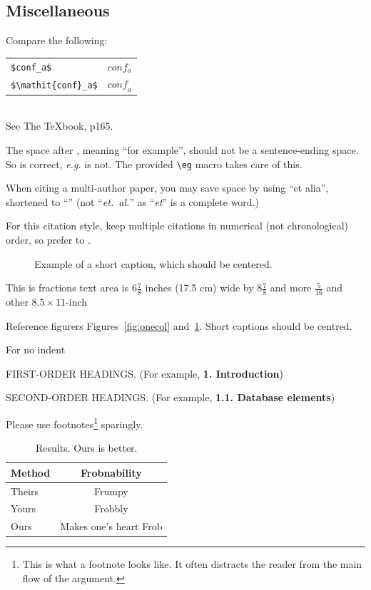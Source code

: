 \documentclass[10pt,twocolumn,letterpaper]{article}
\begin{document}
\subsection{Miscellaneous}

\noindent
Compare the following:\\
\begin{tabular}{ll}
 \verb'$conf_a$' &  $conf_a$ \\
 \verb'$\mathit{conf}_a$' & $\mathit{conf}_a$
\end{tabular}\\
See The \TeX book, p165.

The space after \eg, meaning ``for example'', should not be a
sentence-ending space. So \eg is correct, {\em e.g.} is not.  The provided
\verb'\eg' macro takes care of this.

When citing a multi-author paper, you may save space by using ``et alia'',
shortened to ``\etal'' (not ``{\em et.\ al.}'' as ``{\em et}'' is a complete word.)

For this citation style, keep multiple citations in numerical (not
chronological) order, so prefer \cite{Alpher03,Alpher02,Authors06} to
\cite{Alpher02,Alpher03,Authors06}.


\begin{figure}
  \begin{center}
    \fbox{\rule{0pt}{2in} \rule{.9\linewidth}{0pt}}
  \end{center}
    \caption{Example of a short caption, which should be centered.}
  \label{fig:short}
\end{figure}


This is fractions text area is $6\frac78$ inches (17.5 cm) wide by $8\frac78$
and more $\frac{5}{16}$ and other $8.5 \times 11$-inch

Reference figurers Figures~\ref{fig:onecol} and~\ref{fig:short}.  Short captions should be centred.

\noindent For no indent

FIRST-ORDER HEADINGS. (For example, {\large \bf 1. Introduction})

SECOND-ORDER HEADINGS. (For example, { \bf 1.1. Database elements})

Please use footnotes\footnote {This is what a footnote looks like.  It
often distracts the reader from the main flow of the argument.} sparingly.

\begin{table}
  \begin{center}
    \begin{tabular}{|l|c|}
      \hline
      Method & Frobnability \\
      \hline\hline
      Theirs & Frumpy \\
      Yours & Frobbly \\
      Ours & Makes one's heart Frob\\
      \hline
    \end{tabular}
  \end{center}
  \caption{Results.   Ours is better.}
\end{table}
\end{document}
